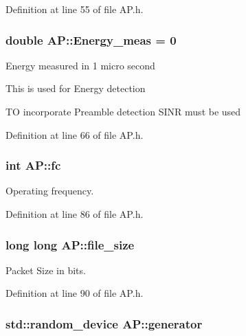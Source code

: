 Definition at line 55 of file A\-P.\-h.

\hypertarget{classAP_a71f625e0df8f494e53ab6e27a2e96bd9}{
\subsubsection[{Energy\-\_\-meas}]{\setlength{\rightskip}{0pt plus 5cm}double A\-P\-::\-Energy\-\_\-meas = 0\hspace{0.3cm}{\ttfamily [private]}}}\label{classAP_a71f625e0df8f494e53ab6e27a2e96bd9}
Energy measured in 1 micro second \par
 This is used for Energy detection \par
 T\-O incorporate Preamble detection S\-I\-N\-R must be used \par
 

Definition at line 66 of file A\-P.\-h.

\hypertarget{classAP_af7f928faaa72cbfe5c4f905cb146a564}{
\subsubsection[{fc}]{\setlength{\rightskip}{0pt plus 5cm}int A\-P\-::fc\hspace{0.3cm}{\ttfamily [private]}}}\label{classAP_af7f928faaa72cbfe5c4f905cb146a564}


Operating frequency. 



Definition at line 86 of file A\-P.\-h.

\hypertarget{classAP_a6fe321d9d8cddb40d81e6c7152fae189}{
\subsubsection[{file\-\_\-size}]{\setlength{\rightskip}{0pt plus 5cm}long long A\-P\-::file\-\_\-size\hspace{0.3cm}{\ttfamily [private]}}}\label{classAP_a6fe321d9d8cddb40d81e6c7152fae189}


Packet Size in bits. 



Definition at line 90 of file A\-P.\-h.

\hypertarget{classAP_adbc9c4c803b5a61b33b6199e1364fb94}{
\subsubsection[{generator}]{\setlength{\rightskip}{0pt plus 5cm}std\-::random\-\_\-device A\-P\-::generator\hspace{0.3cm}{\ttfamily [private]}}}\label{classAP_adbc9c4c803b5a61b33b6199e1364fb94}


